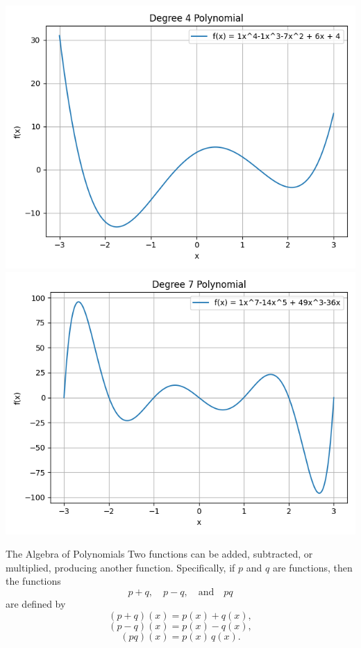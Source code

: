 \documentclass{beamer}
\begin{document}
\begin{frame}
  \centering
  \begin{minipage}[t]{0.45\textwidth}
    \centering
    \includegraphics[width=\linewidth]{polynomial_degree_4.png}\\[1mm]
    \includegraphics[width=\linewidth]{polynomial_degree_7.png}
  \end{minipage}
\end{frame}


\begin{frame}{The Algebra of Polynomials}
  Two functions can be added, subtracted, or multiplied, producing another function. Specifically, if \(p\) and \(q\) are functions, then the functions 
  \[
    p+q,\quad p-q,\quad \text{and} \quad pq
  \]
  are defined by
  \[
    (p+q)(x) = p(x) + q(x),
  \]
  \[
    (p-q)(x) = p(x) - q(x),
  \]
  \[
    (pq)(x) = p(x) \, q(x).
  \]
\end{frame}
\end{document}
